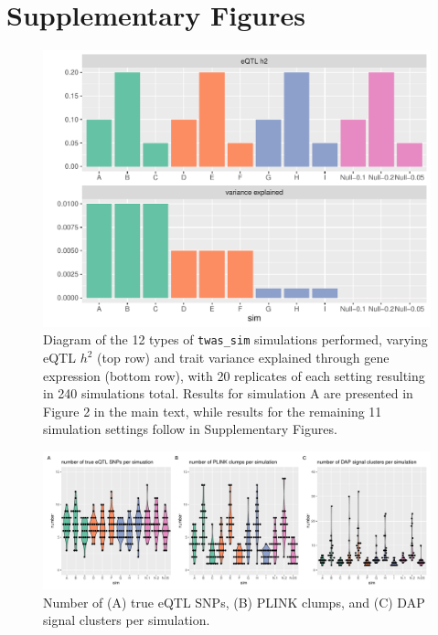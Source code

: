 \documentclass[11pt]{article}
\begin{document}
\clearpage

\section*{Supplementary Figures}

\begin{figure}[!ht]
  \centering
  \includegraphics[width=.7\textwidth]{figs/sim_types}
  \caption{Diagram of the 12 types of \texttt{twas\_sim} simulations
    performed, varying eQTL $h^2$ (top row) and trait variance explained
    through gene expression (bottom row), with 20 replicates of each
    setting resulting in 240 simulations total. Results for simulation
    A are presented in Figure 2 in the main text, while results for
    the remaining 11 simulation settings follow in Supplementary
    Figures.}
\end{figure}

\begin{figure}[!ht]
  \centering
  \includegraphics[width=\textwidth]{figs/sim_details}
  \caption{Number of (A) true eQTL SNPs, (B) PLINK clumps, and (C) DAP
    signal clusters per simulation.}
\end{figure}
\end{document}
